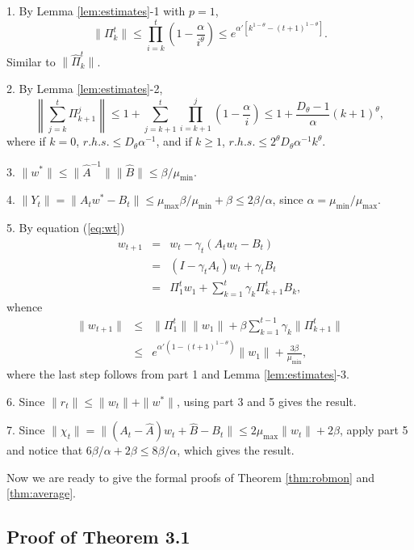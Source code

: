 \documentclass[twoside,twocolumn,journal]{IEEEtran}
\newenvironment{pf}[1][Proof]{\medskip\noindent\hspace{1em}{\itshape #1: }}{\hspace*{\fill}~\QED\par\endtrivlist\medskip}
\def\amax{{\mu_{\max}}}
\def\amin{{\mu_{\min}} }
\begin{document}
\begin{pf} 1. By Lemma \ref{lem:estimates}-1 with $p=1$,
\[ \|\Pi^t_k \|\leq \prod_{i=k}^t \left( 1 - \frac{\alpha}{i^\theta} \right) \leq e^{\alpha'[k^{1-\theta} - (t+1)^{1-\theta}]}. \]
Similar to $\|\hat{\Pi}_k^t\|$.

2. By Lemma \ref{lem:estimates}-2,
\[ \left\|\sum_{j=k}^t \Pi_{k+1}^j \right\| \leq 1+\sum_{j=k+1}^t \prod_{i=k+1}^j \left( 1- \frac{\alpha}{i} \right)\leq 1+\frac{D_\theta-1}{\alpha}(k+1)^\theta, \]
where if $k=0$, $r.h.s. \leq D_\theta \alpha^{-1}$, and if $k\geq 1$, $r.h.s. \leq 2^{\theta} D_\theta \alpha^{-1} k^{\theta}$.

3. $\|w^\ast\|\leq \|\hat{A}^{-1}\|\|\hat{B}\|\leq \beta/\amin$.

4. $\|Y_t\| = \| A_t w^\ast - B_t \| \leq \amax \beta /\amin + \beta \leq 2 \beta/\alpha$, since $\alpha=\amin/\amax$.

5. By equation (\ref{eq:wt})
\begin{eqnarray*}
w_{t+1} & = & w_t - \gamma_t (A_t w_t - B_t) \\
& = & (I - \gamma_t A_t) w_t + \gamma_t B_t \\
& = & \Pi_1^t w_1 + \sum_{k=1}^t \gamma_k \Pi_{k+1}^t B_k,
\end{eqnarray*}
whence
\begin{eqnarray*}
\|w_{t+1}\| & \leq & \|\Pi_1^t\| \|w_1\| + \beta \sum_{k=1}^{t-1} \gamma_k \|\Pi_{k+1}^t\| \\
& \leq & e^{\alpha'(1-(t+1)^{1-\theta})} \|w_1\|+ \frac{3\beta}{\amin},
\end{eqnarray*}
where the last step follows from part 1 and Lemma \ref{lem:estimates}-3.

6. Since $\| r_t \| \leq \|w_t \| + \|w^\ast\|$, using part 3 and 5 gives the result.

7. Since $\|\chi_t\|=\|(A_t - \hat{A})w_t + \hat{B}-B_t \| \leq 2 \amax\|w_t\| + 2\beta$, apply part 5 and notice that $6\beta/\alpha+2\beta\leq 8\beta/\alpha$,
which gives the result.
\end{pf}

Now we are ready to give the formal proofs of Theorem \ref{thm:robmon} and \ref{thm:average}.


\subsection{Proof of Theorem 3.1}
\end{document}
